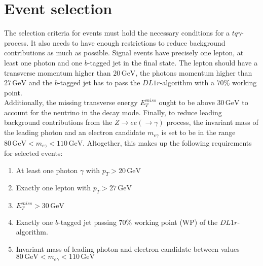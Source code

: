\section{Event selection}
\label{sec:eventselect}
The selection criteria for events must hold the necessary conditions for a $tq\gamma$-process. It also needs to have enough restrictions to reduce background contributions as much as possible. 
Signal events have precisely one lepton, at least one photon and one $b$-tagged jet in the final state. The lepton should have a transverse momentum higher than $20 \,\si{\giga\electronvolt}$, the photons momentum higher than $27\,\si{\giga\electronvolt}$ and 
the $b$-tagged jet has to pass the $DL1r$-algorithm with a $70\%$ working point.\\
Additionally, the missing transverse energy $E_T^{miss}$ ought to be above $30 \,\si{\giga\electronvolt}$ to account for the neutrino in the decay mode. 
Finally, to reduce leading background contributions from the $Z \rightarrow ee(\rightarrow \gamma)$ process, the invariant mass of the leading photon and an electron candidate $m_{e\gamma}$ is set to be in the range $80 \,\si{\giga\electronvolt} < m_{e\gamma} < 110 \,\si{\giga\electronvolt}$.
Altogether, this makes up the following requirements for selected events:
\begin{enumerate}
    \item At least one photon $\gamma$ with $p_T > 20 \,\si{\giga\electronvolt}$
    \item Exactly one lepton with $p_T >27\,\si{\giga\electronvolt}$
    \item $E_T^{miss} > 30 \,\si{\giga\electronvolt}$
    \item Exactly one $b$-tagged jet passing $70\%$ working point (WP) of the $DL1r$-algorithm. 
    \item Invariant mass of leading photon and electron candidate between values $80 \,\si{\giga\electronvolt} < m_{e\gamma} < 110 \,\si{\giga\electronvolt}$  
\end{enumerate}